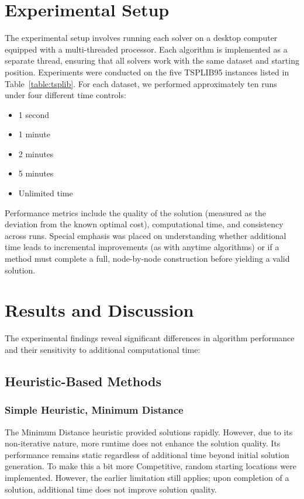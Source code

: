\documentclass[11pt]{article}
\begin{document}
	\section{Experimental Setup}
	The experimental setup involves running each solver on a desktop computer equipped with a multi-threaded processor. Each algorithm is implemented as a separate thread, ensuring that all solvers work with the same dataset and starting position. Experiments were conducted on the five TSPLIB95 instances listed in Table~\ref{table:tsplib}. For each dataset, we performed approximately ten runs under four different time controls:
	\begin{itemize}[noitemsep]
		\item 1 second
		\item 1 minute
		\item 2 minutes
		\item 5 minutes
		\item Unlimited time
	\end{itemize}
	Performance metrics include the quality of the solution (measured as the deviation from the known optimal cost), computational time, and consistency across runs. Special emphasis was placed on understanding whether additional time leads to incremental improvements (as with anytime algorithms) or if a method must complete a full, node-by-node construction before yielding a valid solution.
	
	\section{Results and Discussion}
	The experimental findings reveal significant differences in algorithm performance and their sensitivity to additional computational time:
	
	\subsection{Heuristic-Based Methods}
	
	
	\subsubsection{Simple Heuristic, Minimum Distance}
	The Minimum Distance heuristic provided solutions rapidly. However, due to its non-iterative nature, more runtime does not enhance the solution quality. Its performance remains static regardless of additional time beyond initial solution generation. To make this a bit more Competitive, random starting locations were implemented. However, the earlier limitation still applies; upon completion of a solution, additional time does not improve solution quality.
	
\end{document}
